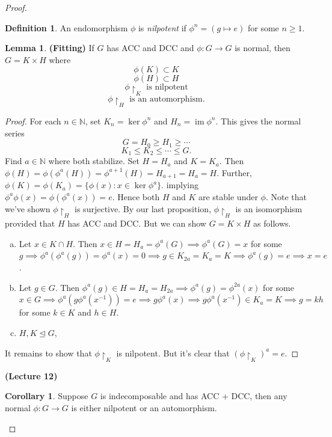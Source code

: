 \documentclass[10pt,letterpaper,cm]{nupset}
\theoremstyle{definition}
\newtheorem*{definition}{Definition}
\newtheorem{corollary}{Corollary}
\newtheorem{lemma}{Lemma}
\newcommand{\N}{\mathbb N}
\newcommand{\1}{\mathbf{1}}
\newcommand{\0}{\vec 0}
\DeclareMathOperator{\im}{im}
\begin{document}
\begin{proof}
\begin{definition}
An endomorphism $\phi$ is \textit{nilpotent} if $\phi^n = (g \mapsto e)$ for some $n\geq 1$.
\end{definition}

\begin{lemma}{\textbf{(Fitting)}}
If $G$ has ACC and DCC and $\phi: G \to G$ is normal, then $G = K \times H$ where $$\phi(K) \subset K$$ $$\phi(H) \subset H$$ $$\phi \restriction_K \text{ is nilpotent}$$ $$\phi \restriction_H \text{ is an automorphism}.$$
\end{lemma}
\begin{proof}
For each $n\in \N$, set $K_n = \ker \phi^n$ and $H_n = \im \phi^n$. This gives the normal series $$G= H_0 \geq H_1 \geq \cdots$$ $$K_1 \leq K_2 \leq \cdots \leq G.$$ Find $a \in \N$ where both stabilize. Set $H = H_a$ and $K = K_a$. Then $\phi(H) = \phi(\phi^a(H)) = \phi^{a+1}(H) = H_{a+1} = H_a = H$. Further, $\phi(K) = \phi(K_a) = \{\phi(x) : x \in \ker \phi^a\}$. implying $\phi^a\phi(x) = \phi(\phi^a(x)) =e$. Hence both $H$ and $K$ are stable under $\phi$. Note that we've shown $\phi \restriction_H$ is surjective. By our last proposition, $\phi \restriction_H$ is an isomorphism provided that $H$ has ACC and DCC. But we can show $G = K \times H$ as follows.
\begin{enumerate}[(a)]
\item Let $x \in K \cap H$. Then $x \in H = H_a = \phi^a(G) \implies \phi^a(G) = x$ for some $g \implies \phi^a(\phi^a(g)) = \phi^a(x) =  0 \implies g \in K_{2a} = K_a = K \implies \phi^a(g) = e \implies x =e$. 
\item Let $g \in G$. Then $ \phi^a(g) \in H = H_a = H_{2a} \implies \phi^a(g) = \phi^{2a}(x)$ for some $x\in G \implies \phi^a(g \phi^a(x^{-1})) =e \implies g\phi^a(x) \implies g\phi^a(x^{-1}) \in K_a =K \implies g = kh$ for some $k\in K$ and $h\in H$.
\item $H, K \unlhd G$,
\end{enumerate}
It remains to show that $\phi \restriction_K$ is nilpotent. But it's clear that $(\phi \restriction_K)^a = e$.
\end{proof}

\begin{center}
{\textbf{(Lecture 12)}}
\end{center}

\begin{corollary} 
Suppose $G$ is indecomposable and has ACC + DCC, then any normal $\phi : G \to G$ is either nilpotent or an automorphism.
\end{corollary}


\end{proof}
\end{document}
